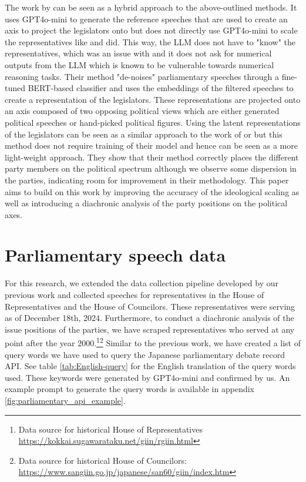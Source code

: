 \documentclass[final,5p,times,twocolumn,authoryear]{elsarticle}
\begin{document}
The work by \citeauthor{kato2024lupinllmbasedpoliticalideology} can be seen as a hybrid approach to the above-outlined methods. It uses GPT4o-mini to generate the reference speeches that are used to create an axis to project the legislators onto but does not directly use GPT4o-mini to scale the representatives like \citeauthor{Scaling-Political-Texts-with-ChatGPT} and \citeauthor{llm-latent-position-of-politicians} did. This way, the LLM does not have to "know" the representatives, which was an issue with \citeauthor{llm-latent-position-of-politicians} and it does not ask for numerical outputs from the LLM which is known to be vulnerable towards numerical reasoning tasks. Their method "de-noises" parliamentary speeches through a fine-tuned BERT-based classifier and uses the embeddings of the filtered speeches to create a representation of the legislators. These representations are projected onto an axis composed of two opposing political views which are either generated political speeches or hand-picked political figures. Using the latent representations of the legislators can be seen as a similar approach to the work of \citeauthor{Debating-Evil:-Using-Word-Embeddings-to-Analyze-Parliamentary-Debates} or \citeauthor{Word-embeddings-for-analysis-of-ideological-placement} but this method does not require training of their model and hence can be seen as a more light-weight approach. They show that their method correctly places the different party members on the political spectrum although we observe some dispersion in the parties, indicating room for improvement in their methodology. This paper aims to build on this work by improving the accuracy of the ideological scaling as well as introducing a diachronic analysis of the party positions on the political axes.

\section{Parliamentary speech data}
\label{section:parliamentary speech data}


For this research, we extended the data collection pipeline developed by our previous work\citep{kato2024lupinllmbasedpoliticalideology} and collected speeches for representatives in the House of Representatives and the House of Councilors. These representatives were serving as of December 18th, 2024. Furthermore, to conduct a diachronic analysis of the issue positions of the parties, we have scraped representatives who served at any point after the year 2000.\footnote{Data source for historical House of Representatives \url{https://kokkai.sugawarataku.net/giin/rgiin.html}}\footnote{Data source for historical House of Councilors: \url{https://www.sangiin.go.jp/japanese/san60/giin/index.htm}} Similar to the previous work, we have created a list of query words we have used to query the Japanese parliamentary debate record API\citep{kokkai_diet_api}. See table \ref{tab:English-query} for the English translation of the query words used. These keywords were generated by GPT4o-mini and confirmed by us. An example prompt to generate the query words is available in appendix \ref{fig:parliamentary_api_example}. 
\end{document}
